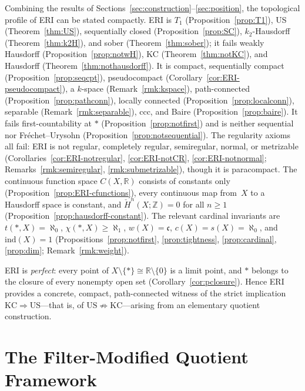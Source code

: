 \documentclass[11pt]{article}
\theoremstyle{definition}
\theoremstyle{remark}
\begin{document}
Combining the results of
Sections~\ref{sec:construction}--\ref{sec:position}, the topological
profile of ERI can be stated compactly.
ERI is $T_1$ (Proposition~\ref{prop:T1}), US (Theorem~\ref{thm:US}),
sequentially closed (Proposition~\ref{prop:SC}), $k_2$-Hausdorff
(Theorem~\ref{thm:k2H}), and sober (Theorem~\ref{thm:sober}); it fails
weakly Hausdorff (Proposition~\ref{prop:notwH}), KC
(Theorem~\ref{thm:notKC}), and Hausdorff
(Theorem~\ref{thm:nothausdorff}).
It is compact, sequentially compact
(Proposition~\ref{prop:seqcpt}), pseudocompact
(Corollary~\ref{cor:ERI-pseudocompact}), a $k$-space
(Remark~\ref{rmk:kspace}), path-connected
(Proposition~\ref{prop:pathconn}), locally connected
(Proposition~\ref{prop:localconn}), separable
(Remark~\ref{rmk:separable}), ccc, and Baire
(Proposition~\ref{prop:baire}).
It fails first-countability at $\ast$
(Proposition~\ref{prop:notfirst}) and is neither sequential nor
Fr\'{e}chet--Urysohn
(Proposition~\ref{prop:notsequential}).
The regularity axioms all fail: ERI is not regular, completely regular,
semiregular, normal, or metrizable
(Corollaries~\ref{cor:ERI-notregular}, \ref{cor:ERI-notCR},
\ref{cor:ERI-notnormal}; Remarks~\ref{rmk:semiregular},
\ref{rmk:submetrizable}), though it is paracompact.
The continuous function space $C(X, \mathbb{R})$ consists of constants
only (Proposition~\ref{prop:ERI-cfunctions}), every continuous map
from~$X$ to a Hausdorff space is constant, and
$\check{H}^n(X; \mathbb{Z}) = 0$ for all $n \geq 1$
(Proposition~\ref{prop:hausdorff-constant}).
The relevant cardinal invariants are
$t(\ast, X) = \aleph_0$, $\chi(\ast, X) \geq \aleph_1$,
$w(X) = \mathfrak{c}$, $c(X) = s(X) = \aleph_0$, and
$\mathrm{ind}(X) = 1$
(Propositions~\ref{prop:notfirst}, \ref{prop:tightness},
\ref{prop:cardinal}, \ref{prop:dim}; Remark~\ref{rmk:weight}).

ERI is \emph{perfect}: every point of
$X \setminus \{\ast\} \cong \mathbb{R} \setminus \{0\}$ is a limit
point, and $\ast$ belongs to the closure of every nonempty open set
(Corollary~\ref{cor:pclosure}).
Hence ERI provides a concrete, compact, path-connected witness of the
strict implication $\mathrm{KC} \Rightarrow \mathrm{US}$---that is, of
$\mathrm{US} \not\Rightarrow \mathrm{KC}$---arising from an elementary
quotient construction.

\section{The Filter-Modified Quotient Framework}\label{sec:fmq}
\end{document}
